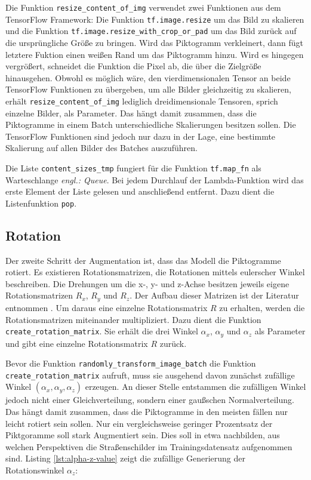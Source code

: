 Die Funktion \texttt{resize_content_of_img} verwendet zwei Funktionen aus dem TensorFlow Framework: Die Funktion \texttt{tf.image.resize} um das Bild zu skalieren und die Funktion \texttt{tf.image.resize_with_crop_or_pad} um das Bild zurück auf die ursprüngliche Größe zu bringen. Wird das Piktogramm verkleinert, dann fügt letztere Fuktion einen weißen Rand um das Piktogramm hinzu. Wird es hingegen vergrößert, schneidet die Funktion die Pixel ab, die über die Zielgröße hinausgehen. Obwohl es möglich wäre, den vierdimensionalen Tensor an beide TensorFlow Funktionen zu übergeben, um alle Bilder gleichzeitig zu skalieren, erhält \texttt{resize_content_of_img} lediglich dreidimensionale Tensoren, sprich einzelne Bilder, als Parameter. Das hängt damit zusammen, dass die Piktogramme in einem Batch unterschiedliche Skalierungen besitzen sollen. Die TensorFlow Funktionen sind jedoch nur dazu in der Lage, eine bestimmte Skalierung auf allen Bilder des Batches auszuführen.

Die Liste \texttt{content_sizes_tmp} fungiert für die Funktion \texttt{tf.map_fn} als Warteschlange \emph{engl.: Queue}. Bei jedem Durchlauf der Lambda-Funktion wird das erste Element der Liste gelesen und anschließend entfernt. Dazu dient die Listenfunktion \texttt{pop}.

\subsection{Rotation}
Der zweite Schritt der Augmentation ist, dass das Modell die Piktogramme rotiert. Es existieren Rotationsmatrizen, die Rotationen mittels eulerscher Winkel beschreiben. Die Drehungen um die x-, y- und z-Achse besitzen jeweils eigene Rotationsmatrizen $R_x$, $R_y$ und $R_z$. Der Aufbau dieser Matrizen ist der Literatur entnommen \cite{math-primer}. Um daraus eine einzelne Rotationsmatrix $R$ zu erhalten, werden die Rotationsmatrizen miteinander multipliziert. Dazu dient die Funktion \texttt{create_rotation_matrix}. Sie erhält die drei Winkel $\alpha_x$, $\alpha_y$ und $\alpha_z$ als Parameter und gibt eine einzelne Rotationsmatrix $R$ zurück.

Bevor die Funktion \texttt{randomly_transform_image_batch} die Funktion \texttt{create_rotation_matrix} aufruft, muss sie ausgehend davon zunächst zufällige Winkel $(\alpha_x, \alpha_y, \alpha_z)$ erzeugen. An dieser Stelle entstammen die zufälligen Winkel jedoch nicht einer Gleichverteilung, sondern einer gaußschen Normalverteilung. Das hängt damit zusammen, dass die Piktogramme in den meisten fällen nur leicht rotiert sein sollen. Nur ein vergleichsweise geringer Prozentsatz der Piktgoramme soll stark Augmentiert sein. Dies soll in etwa nachbilden, aus welchen Perspektiven die Straßenschilder im Trainingsdatensatz aufgenommen sind. Listing \ref{lst:alpha-z-value} zeigt die zufällige Generierung der Rotationswinkel $\alpha_z$:

